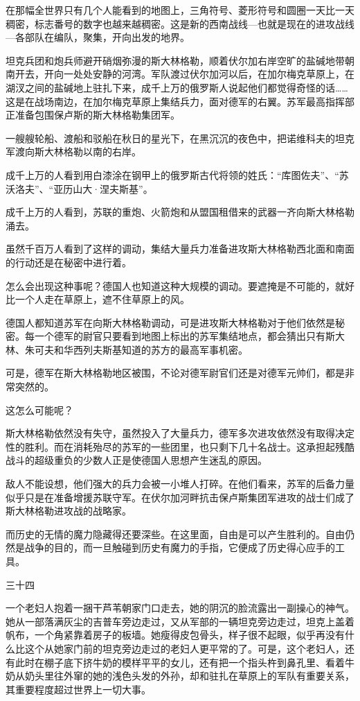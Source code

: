 在那幅全世界只有几个人能看到的地图上，三角符号、菱形符号和圆圈一天比一天稠密，标志番号的数字也越来越稠密。这是新的西南战线—也就是现在的进攻战线—各部队在编队，聚集，开向出发的地界。

坦克兵团和炮兵师避开硝烟弥漫的斯大林格勒，顺着伏尔加右岸空旷的盐碱地带朝南开去，开向一处处安静的河湾。军队渡过伏尔加河以后，在加尔梅克草原上，在湖汊之间的盐碱地上驻扎下来，成千上万的俄罗斯人说起他们都觉得奇怪的话……这是在战场南边，在加尔梅克草原上集结兵力，面对德军的右翼。苏军最高指挥部正准备包围保卢斯的斯大林格勒集团军。

一艘艘轮船、渡船和驳船在秋日的星光下，在黑沉沉的夜色中，把诺维科夫的坦克军渡向斯大林格勒以南的右岸。

成千上万的人看到用白漆涂在钢甲上的俄罗斯古代将领的姓氏：“库图佐夫”、“苏沃洛夫”、“亚历山大·涅夫斯基”。

成千上万的人看到，苏联的重炮、火箭炮和从盟国租借来的武器一齐向斯大林格勒涌去。

虽然千百万人看到了这样的调动，集结大量兵力准备进攻斯大林格勒西北面和南面的行动还是在秘密中进行着。

怎么会出现这种事呢？德国人也知道这种大规模的调动。要遮掩是不可能的，就好比一个人走在草原上，遮不住草原上的风。

德国人都知道苏军在向斯大林格勒调动，可是进攻斯大林格勒对于他们依然是秘密。每一个德军的尉官只要看到地图上标出的苏军集结地点，都会猜出只有斯大林、朱可夫和华西列夫斯基知道的苏方的最高军事机密。

可是，德军在斯大林格勒地区被围，不论对德军尉官们还是对德军元帅们，都是非常突然的。

这怎么可能呢？

斯大林格勒依然没有失守，虽然投入了大量兵力，德军多次进攻依然没有取得决定性的胜利。而在消耗殆尽的苏军的一些团里，也只剩下几十名战士。这承担起残酷战斗的超级重负的少数人正是使德国人思想产生迷乱的原因。

敌人不能设想，他们强大的兵力会被一小堆人打碎。在他们看来，苏军的后备力量似乎只是在准备增援苏联守军。在伏尔加河畔抗击保卢斯集团军进攻的战士们成了斯大林格勒进攻战的战略家。

而历史的无情的魔力隐藏得还要深些。在这里面，自由是可以产生胜利的。自由仍然是战争的目的，而一旦触碰到历史有魔力的手指，它便成了历史得心应手的工具。

三十四

一个老妇人抱着一捆干芦苇朝家门口走去，她的阴沉的脸流露出一副操心的神气。她从一部落满灰尘的吉普车旁边走过，又从军部的一辆坦克旁边走过，坦克上盖着帆布，一个角紧靠着房子的板墙。她瘦得皮包骨头，样子很不起眼，似乎再没有什么比这个从她家门前的坦克旁边走过的老妇人更平常的了。可是，这个老妇人，还有此时在棚子底下挤牛奶的模样平平的女儿，还有把一个指头杵到鼻孔里、看着牛奶从奶头里往外窜的她的浅色头发的外孙，却和驻扎在草原上的军队有重要关系，其重要程度超过世界上一切大事。

